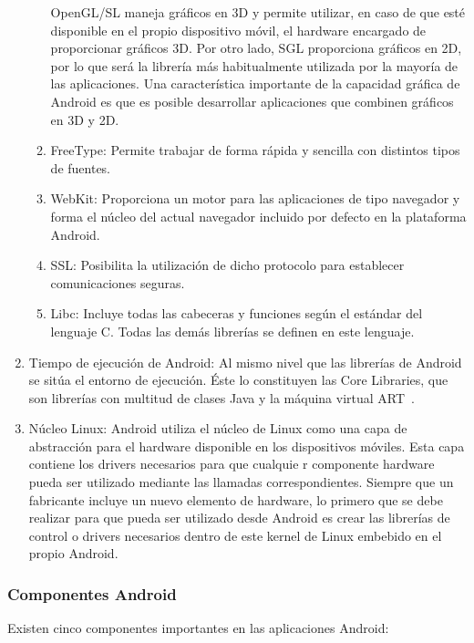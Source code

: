 \begin{enumerate}
\begin{enumerate}
 OpenGL/SL maneja gráficos en 3D y permite utilizar,
 en caso de que esté disponible en el propio dispositivo móvil,
 el hardware encargado de proporcionar gráficos 3D.
 Por otro lado, SGL proporciona gráficos en 2D,
 por lo que será la librería más habitualmente utilizada por
 la mayoría de las aplicaciones. Una característica importante
 de la capacidad gráfica de Android es que es posible 
desarrollar aplicaciones que combinen gráficos en 3D y 2D.
\item	FreeType: Permite trabajar de forma rápida y
 sencilla con distintos tipos de fuentes.
\item	WebKit: Proporciona un motor para las aplicaciones
 de tipo navegador y forma el núcleo del actual navegador
 incluido por defecto en la plataforma Android.
\item	SSL: Posibilita la utilización de dicho protocolo para
 establecer comunicaciones seguras.
\item	Libc: Incluye todas las cabeceras y funciones según
 el estándar del lenguaje C. Todas las demás librerías se 
definen en este lenguaje.
\end{enumerate}
\item	Tiempo de ejecución de Android: Al mismo nivel que las
 librerías de Android se sitúa el entorno de ejecución.
 Éste lo constituyen las Core Libraries, que son librerías con
 multitud de clases Java y la máquina virtual ART~\cite{ART}.
\item Núcleo Linux: Android utiliza el núcleo de Linux como una 
capa de abstracción para el hardware disponible en los dispositivos
 móviles. Esta capa contiene los drivers necesarios para que cualquie
r componente hardware pueda ser utilizado mediante las llamadas
 correspondientes. Siempre que un fabricante incluye un nuevo
 elemento de hardware, lo primero que se debe realizar para que 
pueda ser utilizado desde Android es crear las librerías de control
 o drivers necesarios dentro de este kernel de Linux embebido 
en el propio Android. 
\end{enumerate}
\subsubsection{Componentes Android}
Existen cinco componentes importantes en las aplicaciones Android:

